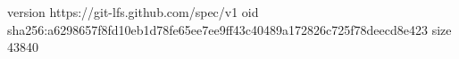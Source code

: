 version https://git-lfs.github.com/spec/v1
oid sha256:a6298657f8fd10eb1d78fe65ee7ee9ff43c40489a172826c725f78deecd8e423
size 43840
